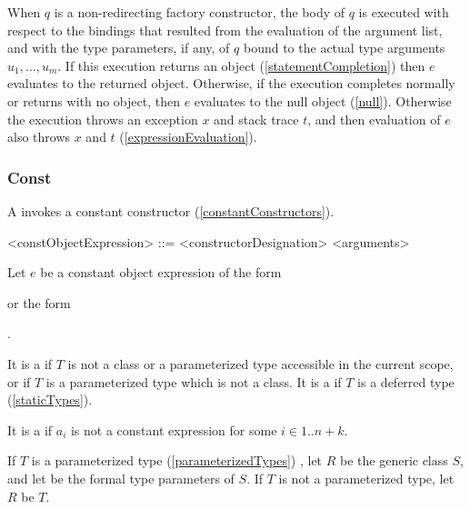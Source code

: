 \documentclass[makeidx]{article}
\begin{document}
{\LMHash{}%
When $q$ is a non-redirecting factory constructor,
the body of $q$ is executed with respect to
the bindings that resulted from the evaluation of the argument list,
and with the type parameters, if any, of $q$ bound to
the actual type arguments $u_1, \ldots, u_m$.
If this execution returns an object
(\ref{statementCompletion})
then $e$ evaluates to the returned object.
Otherwise, if the execution completes normally or returns with no object,
then $e$ evaluates to the null object (\ref{null}).
Otherwise the execution throws an exception $x$ and stack trace $t$,
and then evaluation of $e$ also throws $x$ and $t$
(\ref{expressionEvaluation}).

\EndCase


\subsubsection{Const}

\LMHash{}%
A  invokes a constant constructor
(\ref{constantConstructors}).

\begin{grammar}
<constObjectExpression> ::= \CONST{} <constructorDesignation> <arguments>
\end{grammar}

\LMHash{}%
Let $e$ be a constant object expression of the form

\noindent
{}
or the form

\noindent
{}.

\LMHash{}%
It is a  if $T$ is not
a class or a parameterized type accessible in the current scope,
or if $T$ is a parameterized type which is not a class.
It is a  if $T$ is a deferred type
(\ref{staticTypes}).

\LMHash{}%
It is a  if $a_i$ is not a constant expression
for some $i \in 1 .. n + k$.

\LMHash{}%
If $T$ is a parameterized type (\ref{parameterizedTypes})
,
let $R$ be the generic class $S$,
and let
be the formal type parameters of $S$.
If $T$ is not a parameterized type, let $R$ be $T$.

}
\end{document}
